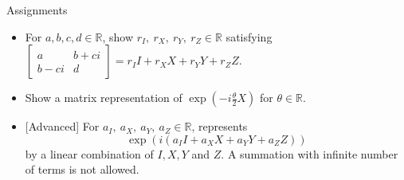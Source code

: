 \documentclass{beamer}
\begin{document}
\begin{frame}{Assignments}
\begin{itemize}
\setlength{\itemsep}{2em}
\item For $a,b,c,d\in\mathbb{R}$, show $r_I,\ r_X,\ r_Y,\ r_Z\in\mathbb{R}$ satisfying $\begin{bmatrix}a&b+ci\\b-ci&d\end{bmatrix} = r_II+r_XX+r_YY+r_ZZ$.
\item Show a matrix representation of $\exp\left(-i\frac{\theta}2 X\right)$ for $\theta\in\mathbb{R}$.
\item {[Advanced]} For $a_I,\ a_X,\ a_Y,\ a_Z\in\mathbb{R}$, represents
\begin{equation*}
\exp\left(i(a_II+a_XX+a_YY+a_ZZ)\right)
\end{equation*}
by a linear combination of $I, X, Y$ and $Z$.
A summation with infinite number of terms is not allowed.
\end{itemize}
\end{frame}
\end{document}
